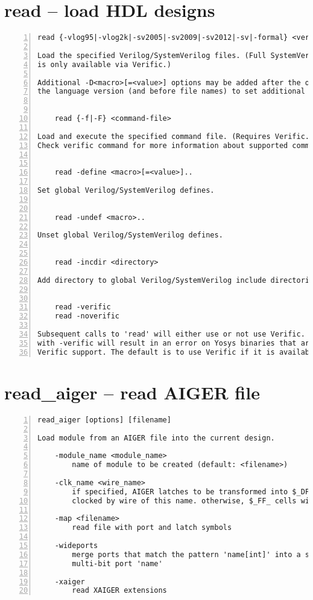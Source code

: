 \section{read -- load HDL designs}
\label{cmd:read}
\begin{lstlisting}[numbers=left,frame=single]
    read {-vlog95|-vlog2k|-sv2005|-sv2009|-sv2012|-sv|-formal} <verilog-file>..

Load the specified Verilog/SystemVerilog files. (Full SystemVerilog support
is only available via Verific.)

Additional -D<macro>[=<value>] options may be added after the option indicating
the language version (and before file names) to set additional verilog defines.


    read {-f|-F} <command-file>

Load and execute the specified command file. (Requires Verific.)
Check verific command for more information about supported commands in file.


    read -define <macro>[=<value>]..

Set global Verilog/SystemVerilog defines.


    read -undef <macro>..

Unset global Verilog/SystemVerilog defines.


    read -incdir <directory>

Add directory to global Verilog/SystemVerilog include directories.


    read -verific
    read -noverific

Subsequent calls to 'read' will either use or not use Verific. Calling 'read'
with -verific will result in an error on Yosys binaries that are built without
Verific support. The default is to use Verific if it is available.
\end{lstlisting}

\section{read\_aiger -- read AIGER file}
\label{cmd:read_aiger}
\begin{lstlisting}[numbers=left,frame=single]
    read_aiger [options] [filename]

Load module from an AIGER file into the current design.

    -module_name <module_name>
        name of module to be created (default: <filename>)

    -clk_name <wire_name>
        if specified, AIGER latches to be transformed into $_DFF_P_ cells
        clocked by wire of this name. otherwise, $_FF_ cells will be used

    -map <filename>
        read file with port and latch symbols

    -wideports
        merge ports that match the pattern 'name[int]' into a single
        multi-bit port 'name'

    -xaiger
        read XAIGER extensions
\end{lstlisting}

